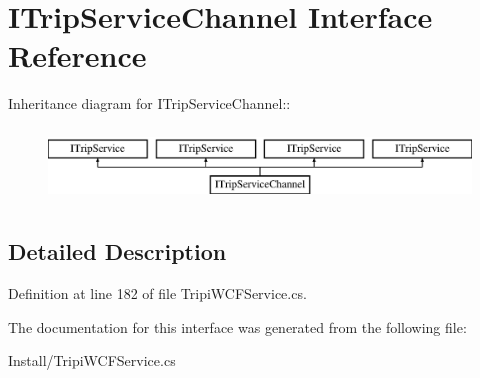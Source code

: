 \hypertarget{interface_i_trip_service_channel}{
\section{ITripServiceChannel Interface Reference}
\label{interface_i_trip_service_channel}
}
Inheritance diagram for ITripServiceChannel::\begin{figure}[H]
\begin{center}
\leavevmode
\includegraphics[height=2cm]{interface_i_trip_service_channel}
\end{center}
\end{figure}


\subsection{Detailed Description}


Definition at line 182 of file TripiWCFService.cs.

The documentation for this interface was generated from the following file:\begin{DoxyCompactItemize}
\item 
Install/TripiWCFService.cs\end{DoxyCompactItemize}
